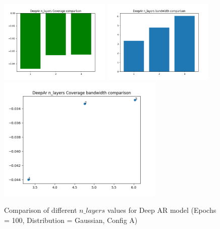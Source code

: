 \documentclass[a4paper, 12pt]{article}
\begin{document}
\begin{figure}[!h]
    \centering
    \includegraphics[width=200px]{plots/hist/a/DeepAr/n_layers/Coverage.png}
    \includegraphics[width=200px]{plots/hist/a/DeepAr/n_layers/bandwidth.png}
    \includegraphics[width=300px]{plots/scatter/a/DeepAr/n_layers/Coverage_bandwidth.png}
    \caption{Comparison of different $n\_layers$ values for Deep AR model (Epochs = 100, Distribution = Gaussian, Config A)}
    \label{fig:comp_deepar_n_layers}
\end{figure}
\end{document}
